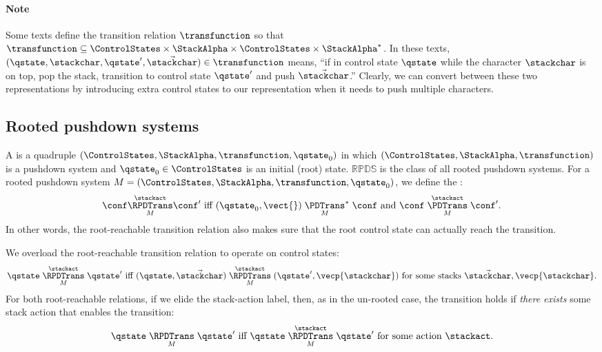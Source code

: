 \paragraph{Note}
Some texts define the transition relation $\transfunction$ so that 
$\transfunction \subseteq \ControlStates \times \StackAlpha \times \ControlStates
\times \StackAlpha^*$.
In these texts, $(\qstate,\stackchar,\qstate',\vec{\stackchar}) \in
\transfunction$ means, ``if in control state $\qstate$ while the
character $\stackchar$ is on top, pop the stack, transition to
control state $\qstate'$ and push $\vec{\stackchar}$.''
Clearly, we can convert between these two representations by
introducing extra control states to our representation when it needs
to push multiple characters.



\subsection{Rooted pushdown systems}

A  is a quadruple 
$(\ControlStates,\StackAlpha,\transfunction,\qstate_0)$ in which 
$(\ControlStates,\StackAlpha,\transfunction)$ is a pushdown system and
$\qstate_0 \in \ControlStates$ is an initial (root) state.
$\mathbb{RPDS}$  is the class of all rooted pushdown
systems.
For a rooted pushdown system $M =
(\ControlStates,\StackAlpha,\transfunction,\qstate_0)$, we define 
the :
\begin{equation*}
\conf \overset{\stackact}{\underset{M}{\RPDTrans}} \conf' \text{ iff } 
(\qstate_0,\vect{})
\mathrel{\underset{M}{\PDTrans}^*} 
\conf 
\text{ and }
\conf 
\mathrel{\overset{\stackact}{\underset{M}{\PDTrans}}}
\conf'
\text.
\end{equation*}
In other words, the root-reachable transition relation also makes
sure that the root control state can actually reach the transition.


We overload the root-reachable transition relation to operate on
control states:
\begin{equation*}
\qstate 
\mathrel{\overset{\stackact}{\underset{M}{\RPDTrans}}}
\qstate' \text{ iff }
(\qstate,\vec{\stackchar}) 
\mathrel{\overset{\stackact}{\underset{M}{\RPDTrans}}}
(\qstate',\vecp{\stackchar}) 
\text{ for some stacks }
\vec{\stackchar},
\vecp{\stackchar}
\text.
\end{equation*}
For both root-reachable relations, if we elide the stack-action label,
then, as in the un-rooted case, the transition holds if \emph{there
  exists} some stack action that enables the transition:
  \begin{align*}
  \qstate 
  \mathrel{\underset{M}{\RPDTrans}}
  \qstate' \text{ iff }
  \qstate 
  \mathrel{\overset{\stackact}{\underset{M}{\RPDTrans}}}
  \qstate' 
  \text{ for some action } \stackact
  \text.
  \end{align*}


